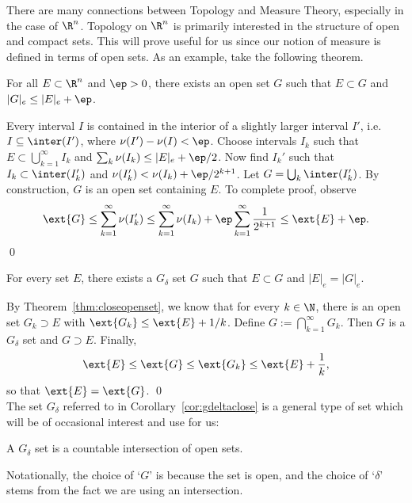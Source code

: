 There are many connections between Topology and Measure Theory, especially in the case of $\R^n$. Topology on $\R^n$ is primarily interested in the structure of open and compact sets. This will prove useful for us since our notion of measure is defined in terms of open sets. As an example, take the following theorem. 


\begin{thm} \label{thm:closeopenset}
For all $E \subset \R^n$ and $\ep>0$, there exists an open set $G$ such that $E \subset G$ and $|G|_e \leq |E|_e + \ep$.
\end{thm}

\pf Every interval $I$ is contained in the interior of a slightly larger interval $I'$, i.e. $I \subseteq \inter(I')$, where $\nu(I')  - \nu(I)<\ep$. Choose intervals $I_k$ such that $E \subset \bigcup_{k=1}^\infty I_k$ and $\sum_k \nu(I_k) \leq |E|_e + \ep/2$. Now find $I_k'$ such that $I_k \subset \inter (I_k')$ and $\nu(I_k') < \nu(I_k) + \ep/2^{k+1}$. Let $G= \bigcup_k \inter(I_k')$. By construction, $G$ is an open set containing $E$. To complete proof, observe
	\[
	\ext{G} \leq \sum_{k=1}^\infty \nu(I_k') \leq \sum_{k=1}^\infty \nu(I_k) + \ep \sum_{k=1}^\infty \dfrac{1}{2^{k+1}} \leq \ext{E} + \ep.
	\] \qed \\


\begin{cor} \label{cor:gdeltaclose}
For every set $E$, there exists a $G_\delta$ set $G$ such that $E \subset G$ and $|E|_e=|G|_e$.
\end{cor}

\pf By Theorem~\ref{thm:closeopenset}, we know that for every $k \in \N$, there is an open set $G_k \supset E$ with $\ext{G_k} \leq \ext{E}+ 1/k$. Define $G:= \bigcap_{k=1}^\infty G_k$. Then $G$ is a $G_\delta$ set and $G \supset E$. Finally, 
	\[
	\ext{E} \leq \ext{G} \leq \ext{G_k} \leq \ext{E} + \dfrac{1}{k},
	\]
so that $\ext{E}= \ext{G}$. \qed \\


\noindent The set $G_\delta$ referred to in Corollary~\ref{cor:gdeltaclose} is a general type of set which will be of occasional interest and use for us:


\begin{dfn}
A $G_\delta$ set is a countable intersection of open sets. 
\end{dfn}


\noindent Notationally, the choice of `$G$' is because the set is open, and the choice of `$\delta$' stems from the fact we are using an intersection.



